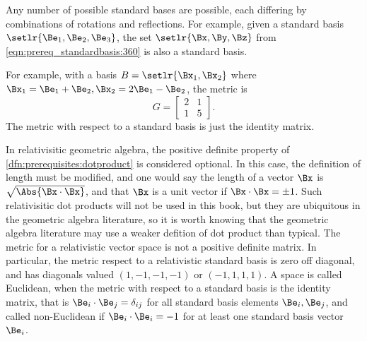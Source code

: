 
Any number of possible standard bases are possible, each differing by combinations of rotations and reflections.  For example, given a standard basis \( \setlr{ \Be_1, \Be_2, \Be_3 } \), the set \( \setlr{\Bx, \By, \Bz} \) from \cref{eqn:prereq_standardbasis:360} is also a standard basis.


For example, with a basis \( B = \setlr{\Bx_1, \Bx_2} \) where \( \Bx_1 = \Be_1 + \Be_2, \Bx_2 = 2 \Be_1 - \Be_2 \), the metric is
\begin{dmath}\label{eqn:prereq_standardbasis:400}
G =
\begin{bmatrix}
2 & 1 \\
1 & 5
\end{bmatrix}.
\end{dmath}
The metric with respect to a standard basis is just the identity matrix.

In relativisitic geometric algebra, the positive definite property of \cref{dfn:prerequisites:dotproduct} is considered optional.
In this case, the definition of length must be modified, and one would say the length of a vector \( \Bx \) is \( \sqrt{\Abs{\Bx \cdot \Bx}} \), and that \( \Bx \) is a unit vector if \( \Bx \cdot \Bx = \pm 1 \).
Such relativisitic dot products will not be used in this book, but they are ubiquitous in the geometric algebra literature, so
it is worth knowing that the geometric algebra literature may use a weaker defition of dot product than typical.
The metric for a relativistic vector space is not a positive definite matrix.  In particular, the metric respect to a relativistic standard basis is zero off diagonal, and has
diagonals valued \( (1, -1, -1, -1) \) or \( (-1, 1, 1, 1) \).
A space is called Euclidean, when the metric with respect to a standard basis is the identity matrix, that is
\( \Be_i \cdot \Be_j = \delta_{ij} \) for all standard basis elements \( \Be_i, \Be_j \), and
called non-Euclidean if \( \Be_i \cdot \Be_i = -1 \) for at least one standard basis vector \( \Be_i \).

